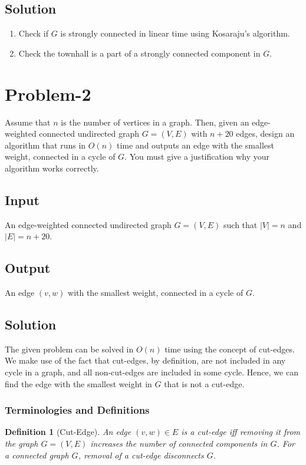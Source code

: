 \documentclass[12pt]{report}
\newtheorem{definition}{Definition}
\begin{document}
    \subsection*{Solution}
    \begin{enumerate}[label=(\alph*)]
        \item Check if $G$ is strongly connected in linear time using Kosaraju's algorithm.
        \item Check the townhall is a part of a strongly connected component in $G$.
    \end{enumerate}

    \pagebreak

    \section*{\huge{Problem-2}}
    Assume that $n$ is the number of vertices in a graph.
    Then, given an edge-weighted connected undirected graph $G = (V, E)$ with $n + 20$ edges, design an algorithm that runs in $O(n)$
    time and outputs an edge with the smallest weight, connected in a cycle of $G$.
    You must give a justification why your algorithm works correctly.

    \subsection*{Input}
    An edge-weighted connected undirected graph $G = (V, E)$ such that $|V| = n$ and $|E| = n + 20$.

    \subsection*{Output}
    An edge $(v, w)$ with the smallest weight, connected in a cycle of $G$.

    \subsection*{Solution}
    The given problem can be solved in $O(n)$ time using the concept of cut-edges.
    We make use of the fact that cut-edges, by definition, are not included in any cycle in a graph, and all non-cut-edges are included in some cycle.
    Hence, we can find the edge with the smallest weight in $G$ that is not a cut-edge.

    \subsubsection*{Terminologies and Definitions}
    \begin{definition}[Cut-Edge]
        \label{def:cut-edge}
        An edge $(v, w) \in E$ is a cut-edge iff removing it from the graph $G = (V, E)$ increases the number of connected components in $G$.
        For a connected graph $G$, removal of a cut-edge disconnects $G$.
    \end{definition}
\end{document}
